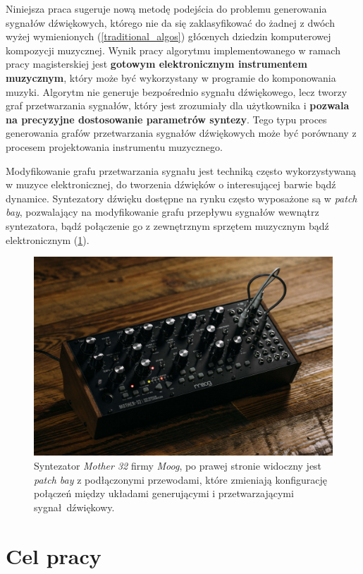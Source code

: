 Niniejsza praca sugeruje nową metodę podejścia do problemu generowania sygnałów dźwiękowych,
którego nie da się zaklasyfikować do żadnej z dwóch wyżej wymienionych (\ref{traditional_algos}) głóœnych dziedzin komputerowej kompozycji muzycznej.
Wynik pracy algorytmu implementowanego w ramach pracy magisterskiej jest \textbf{gotowym elektronicznym
instrumentem muzycznym}, który może być wykorzystany w programie do komponowania muzyki. Algorytm nie generuje bezpośrednio sygnału dźwiękowego, lecz tworzy graf przetwarzania sygnałów, który jest zrozumiały dla użytkownika i \textbf{pozwala na precyzyjne dostosowanie parametrów syntezy}.
Tego typu proces generowania grafów przetwarzania sygnałów dźwiękowych może być porównany z procesem projektowania instrumentu muzycznego.

Modyfikowanie grafu przetwarzania sygnału jest techniką często wykorzystywaną w muzyce
elektronicznej, do tworzenia dźwięków o interesującej barwie bądź dynamice. Syntezatory dźwięku
dostępne na rynku często wyposażone są w \textit{patch bay}, pozwalający na modyfikowanie
grafu przepływu sygnałów wewnątrz syntezatora, bądź połączenie go z zewnętrznym sprzętem muzycznym
bądź elektronicznym (\ref{fig:mother32}).

\begin{figure}[H]\label{fig:mother32}
    \centering
    \includegraphics[width=0.7\linewidth]{rys01/mother32.jpg}
    \caption{Syntezator \textit{Mother 32} firmy \textit{Moog}, po prawej stronie widoczny
    jest \textit{patch bay} z podłączonymi przewodami, które zmieniają konfigurację
    połączeń między układami generującymi i przetwarzającymi sygnał dźwiękowy.}
\end{figure}


\section{Cel pracy}


